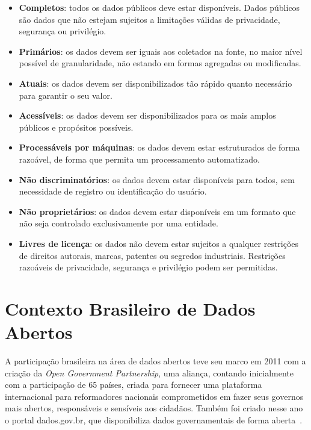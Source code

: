 \begin{itemize}
\item \textbf{Completos}: todos os dados públicos deve estar disponíveis. Dados públicos são dados que não estejam sujeitos a limitações válidas de privacidade, segurança ou privilégio.

\item \textbf{Primários}: os dados devem ser iguais aos coletados na fonte, no maior nível possível de granularidade, não estando em formas agregadas ou modificadas.

\item \textbf{Atuais}: os dados devem ser disponibilizados tão rápido quanto necessário para garantir o seu valor.

\item \textbf{Acessíveis}: os dados devem ser disponibilizados para os mais amplos públicos e propósitos possíveis.

\item \textbf{Processáveis por máquinas}: os dados devem estar estruturados de forma razoável, de forma que permita um processamento automatizado.

\item \textbf{Não discriminatórios}: os dados devem estar disponíveis para todos, sem necessidade de registro ou identificação do usuário.

\item \textbf{Não proprietários}: os dados devem estar disponíveis em um formato que não seja controlado exclusivamente por uma entidade.

\item \textbf{Livres de licença}: os dados não devem estar sujeitos a qualquer restrições de direitos autorais, marcas, patentes ou segredos industriais. Restrições razoáveis de privacidade, segurança e privilégio podem ser permitidas.

\end{itemize}

\section{Contexto Brasileiro de Dados Abertos}
A participação brasileira na área de dados abertos teve seu marco em 2011 com a criação da \emph{Open Government Partnership}, uma aliança, contando inicialmente com a participação de 65 países, criada para fornecer uma plataforma internacional para reformadores nacionais comprometidos em fazer seus governos mais abertos, responsáveis e sensíveis aos cidadãos. Também foi criado nesse ano o portal dados.gov.br, que disponibiliza dados governamentais de forma aberta~\cite{seijiconectados}.

